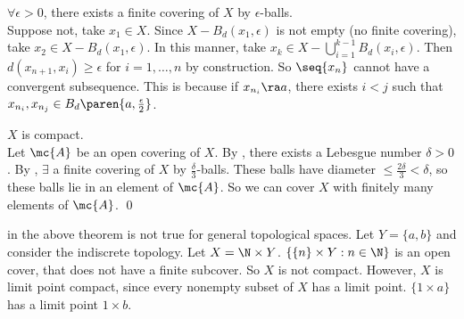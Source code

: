 \pagebreak

 \(\forall \epsilon > 0\), there exists a finite covering of \(X\) by \(\epsilon\)-balls. \\
Suppose not, take \(x_1 \in X\). Since \(X - B_d(x_1, \epsilon)\) is not empty (no finite covering), take \(x_2 \in X - B_d(x_1, \epsilon)\). In this manner, take \(x_k \in X - \bigcup_{i=1}^{k - 1} B_d(x_i, \epsilon)\). Then \(d(x_{n+1}, x_i) \geq \epsilon\) for \(i = 1, \dots, n\) by construction. So \(\seq{x_n}\) cannot have a convergent subsequence. This is because if \(x_{n_i} \ra a\), there exists \(i < j\) such that \(x_{n_i}, x_{n_j} \in B_d\paren{a, \frac{\epsilon}{2}}\).

 \(X\) is compact. \\
Let \(\mc{A}\) be an open covering of \(X\). By , there exists a Lebesgue number \(\delta > 0\). By , \(\exists\) a finite covering of \(X\) by \(\frac{\delta}{3}\)-balls. These balls have diameter \(\leq \frac{2\delta}{3} < \delta\), so these balls lie in an element of \(\mc{A}\). So we can cover \(X\) with finitely many elements of \(\mc{A}\). \qed

 in the above theorem is not true for general topological spaces. Let \(Y = \{a, b\}\) and consider the indiscrete topology. Let \(X = \N \times Y\). \(\{\{n\} \times Y : n \in \N\}\) is an open cover, that does not have a finite subcover. So \(X\) is not compact. However, \(X\) is limit point compact, since every nonempty subset of \(X\) has a limit point. \(\{1 \times a\}\) has a limit point \(1 \times b\).

\pagebreak
